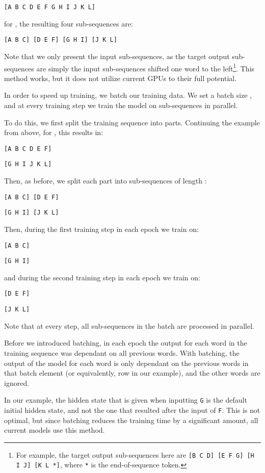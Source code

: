 \documentclass[11pt,a4paper]{article}
\begin{document}
\texttt{[A B C D E F G H I J K L]}

\noindent for , the resulting four sub-sequences are:

\texttt{[A B C] [D E F] [G H I] [J K L]}

Note that we only present the input sub-sequences, as the target output sub-sequences are simply the input sub-sequences shifted one word to the left\footnote{For example, the target output sub-sequences here are \texttt{[B C D] [E F G] [H I J] [K L *]}, where \texttt{*} is the end-of-sequence token.}. 
This method works, but it does not utilize current GPUs to their full potential. 

In order to speed up training, we batch our training data. We set a batch size , and at every training step we train the model on  sub-sequences in parallel. 

To do this, we first split the training sequence into  parts. Continuing the example from above, for , this results in:

\texttt{[A B C D E F]}

\texttt{[G H I J K L]}

Then, as before, we split each part into sub-sequences of length :


\texttt{[A B C] [D E F]}

\texttt{[G H I] [J K L]}

\noindent Then, during the first training step in each epoch we train on:

\texttt{[A B C] }

\texttt{[G H I] }

\noindent and during the second training step in each epoch we train on:

\texttt{[D E F] }

\texttt{[J K L]}

Note that at every step, all sub-sequences in the batch are processed in parallel. 

Before we introduced batching, in each epoch the output for each word in the training sequence was dependant on all previous words. 
With batching, the output of the model for each word is only dependant on the previous words in that batch element (or equivalently, row in our example), and the other words are ignored.


In our example, the hidden state that is given when inputting \texttt{G} is the default initial hidden state, and not the one that resulted after the input of \texttt{F}. This is not optimal, but since batching reduces the training time by a significant amount, all current models use this method. 
\end{document}
